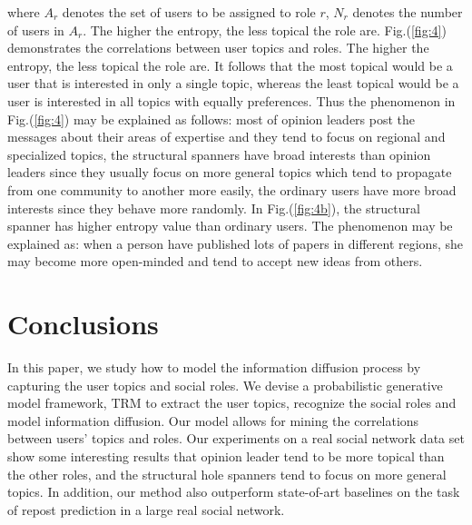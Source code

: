\documentclass[runningheads,a4paper]{llncs}
\begin{document}
where $A_r$ denotes the set of users to be assigned to role $r$, $N_r$ denotes the number of users in $A_r$. The higher the entropy, the less topical the role are.
 Fig.(\ref{fig:4}) demonstrates the correlations between user topics and roles. The higher the entropy, the less topical the role are. It follows that the most topical would be a user that is interested in only a single topic, whereas the least topical would be a user is interested in all topics with equally preferences. Thus the phenomenon in Fig.(\ref{fig:4}) may be explained as follows: most of opinion leaders post the messages about their areas of expertise and they tend to focus on regional and specialized topics, the structural spanners have broad interests than opinion leaders since they usually focus on more general topics which tend to propagate from one community to another more easily, the ordinary users have more broad interests since they behave more randomly. In Fig.(\ref{fig:4b}), the structural spanner has higher entropy value than ordinary users. The phenomenon may be explained as: when a person have published lots of papers in different regions, she may become more open-minded and tend to accept new ideas from others.

\section{Conclusions}
\vspace{-10pt}
In this paper, we study how to model the information diffusion process by capturing the user topics and social roles. We devise a probabilistic generative model framework, TRM to extract the user topics, recognize the social roles and model information diffusion. Our model allows for mining the correlations between users' topics and roles. Our experiments on a real social network data set show some interesting results that opinion leader tend to be more topical than the other roles, and the structural hole spanners tend to focus on more general topics. In addition, our method also outperform state-of-art baselines on the task of repost prediction in a large real social network.



{



}
\end{document}
